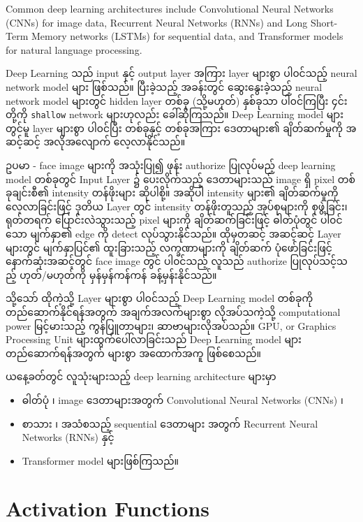 Common deep learning architectures include Convolutional Neural Networks (CNNs) for image data, Recurrent Neural Networks (RNNs) and Long Short-Term Memory networks (LSTMs) for sequential data, and Transformer models for natural language processing. 

\vspace{0.5em}
\noindent Deep Learning သည် input နှင့် output layer အကြား layer များစွာ ပါ၀င်သည့် neural network model များ ဖြစ်သည်။ ပြီးခဲ့သည့် အခန်းတွင် ဆွေးနွေးခဲ့သည့် neural network model များတွင် hidden layer တစ်ခု (သို့မဟုတ်) နှစ်ခုသာ ပါ၀င်ကြပြီး ၄င်းတို့ကို \texttt{shallow} network များဟုလည်း ခေါ်ဆိုကြသည်။ Deep Learning model များတွင်မူ layer များစွာ ပါ၀င်ပြီး တစ်ခုနှင့် တစ်ခုအကြား ဒေတာများ၏ ချိတ်ဆက်မှုကို အဆင့်ဆင့် အလိုအလျောက် လေ့လာနိုင်သည်။ 

ဥပမာ - face image များကို အသုံးပြု၍  ဖုန်း authorize ပြုလုပ်မည့် deep learning model တစ်ခုတွင် Input Layer ၌ ပေးလိုက်သည့် ဒေတာများသည် image ရှိ pixel တစ်ခုချင်းစီ၏ intensity တန်ဖိုးများ ဆိုပါစို့။ အဆိုပါ  intensity များ၏ ချိတ်ဆက်မှုကို လေ့လာခြင်းဖြင့် ဒုတိယ Layer တွင် intensity တန်ဖိုးတူသည့် အုပ်စုများကို စုဖွဲ့ခြင်း၊ ရုတ်တရက် ပြောင်းလဲသွားသည့် pixel များကို ချိတ်ဆက်ခြင်းဖြင့် ဓါတ်ပုံတွင် ပါ၀င်သော မျက်နှာ၏ edge ကို detect လုပ်သွားနိုင်သည်။ ထိုမှတဆင့် အဆင့်ဆင့် Layer များတွင် မျက်နှာပြင်၏ ထူးခြားသည့် လက္ခဏာများကို ချိတ်ဆက် ပုံဖော်ခြင်းဖြင့် နောက်ဆုံးအဆင့်တွင် face image တွင် ပါ၀င်သည့် လူသည် authorize ပြုလုပ်သင့်သည့် ဟုတ်/မဟုတ်ကို မှန်မှန်ကန်ကန် ခန့်မှန်းနိုင်သည်။ 

\noindent သို့သော် ထိုကဲ့သို့ Layer များစွာ ပါ၀င်သည့် Deep Learning model တစ်ခုကို တည်ဆောက်နိုင်ရန်အတွက် အချက်အလက်များစွာ လိုအပ်သကဲ့သို့ computational power မြင့်မားသည့် ကွန်ပြူတာများ၊ ဆာဗာများလိုအပ်သည်။  GPU, or Graphics Processing Unit များထွက်ပေါ်လာခြင်းသည် Deep Learning model များ တည်ဆောက်ရန်အတွက် များစွာ အထောက်အကူ ဖြစ်စေသည်။ 

\noindent ယနေ့ခတ်တွင် လူသုံးများသည့် deep learning architecture များမှာ 
\begin{itemize}
  \item ဓါတ်ပုံ ၊ image ဒေတာများအတွက်  Convolutional Neural Networks (CNNs) ၊ 
  \item စာသား ၊ အသံစသည့် sequential ဒေတာများ အတွက် Recurrent Neural Networks (RNNs) နှင့် 
  \item Transformer model များဖြစ်ကြသည်။ 
\end{itemize}

\newpage 
\section{Activation Functions}\label{sec:activation}

